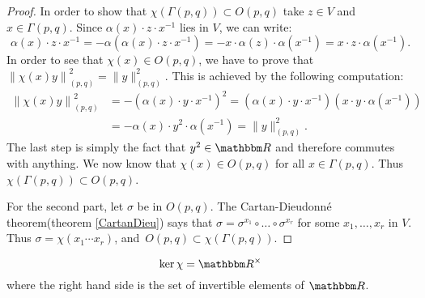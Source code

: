 \begin{proof}
In order to show that $\chi(\Gamma(p,q))\subset O(p,q)$ take $z\in V$ and $x\in\Gamma(p,q)$. Since $\alpha(x)\cdot z\cdot x^{-1}$ lies in $V$, we can write:
\[
\alpha(x)\cdot z\cdot x^{-1}=-\alpha\left(\alpha(x)\cdot z\cdot x^{-1}\right)
=-x\cdot\alpha(z)\cdot\alpha(x^{-1})=x\cdot z\cdot\alpha(x^{-1}).
\]
In order to see that $\chi(x)\in O(p,q)$, we have to prove that $\left\|\chi(x)y\right\|_{(p,q)}^2=\|y\|_{(p,q)}^2$. This is achieved by the following computation:
\begin{equation}
\begin{split}
 \left\|\chi(x)y\right\|_{(p,q)}^2&=-\left(\alpha(x)\cdot y\cdot x^{-1}\right)^2
                                  =\left(\alpha(x)\cdot y\cdot x^{-1}\right)\left(x\cdot y\cdot\alpha(x^{-1})\right)\\
                                  &=-\alpha(x)\cdot y^2\cdot\alpha(x^{-1})
                                  =\|y\|^2_{(p,q)}.
\end{split}
\end{equation}
The last step is simply the fact that $y^2\in\eR$ and therefore commutes with anything. We now know that $\chi(x)\in O(p,q)$ for all $x\in\Gamma(p,q)$. Thus $\chi(\Gamma(p,q))\subset O(p,q)$.

For the second part, let $\sigma$ be in $O(p,q)$. The Cartan-Dieudonné theorem(theorem \ref{CartanDieu}) says that $\sigma=\sigma^{x_1}\circ\ldots\circ\sigma^{x_r}$ for some $x_1,\ldots, x_r$ in $V$. Thus $\sigma=\chi(x_1\cdots x_r)$, \hbox{and $O(p,q)\subset\chi(\Gamma(p,q))$}.
\end{proof}

\begin{proposition}
\begin{equation}
      \ker\chi=\eR\invtible
\end{equation}
where the right hand side is the set of invertible elements of $\eR$.
\label{prop1001p1}
\end{proposition}

